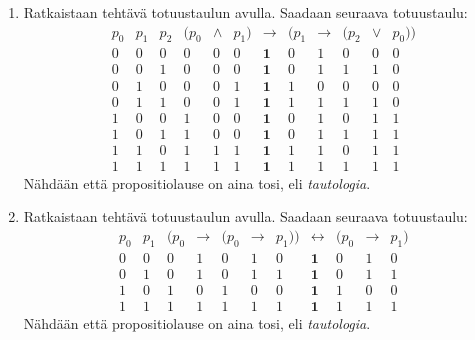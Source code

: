 \documentclass[11pt,a4paper]{amsart}
\begin{document}
\begin{solution}
\leavevmode\par
\begin{enumerate}[label=\alph*), nosep]
\item Ratkaistaan tehtävä totuustaulun avulla. Saadaan seuraava totuustaulu:
\[
\begin{array}{ccc|ccccccccc}
p_0 & p_1 & p_2
& (p_0 & \land & p_1)
& \boldsymbol{\to}
& (p_1 & \to & (p_2 & \lor & p_0)) \\
\hline
0 & 0 & 0
& 0 & 0 & 0
& \mathbf{1}
& 0 & 1 & 0 & 0 & 0 \\

0 & 0 & 1
& 0 & 0 & 0
& \mathbf{1}
& 0 & 1 & 1 & 1 & 0 \\

0 & 1 & 0
& 0 & 0 & 1
& \mathbf{1}
& 1 & 0 & 0 & 0 & 0 \\

0 & 1 & 1
& 0 & 0 & 1
& \mathbf{1}
& 1 & 1 & 1 & 1 & 0 \\

1 & 0 & 0
& 1 & 0 & 0
& \mathbf{1}
& 0 & 1 & 0 & 1 & 1 \\

1 & 0 & 1
& 1 & 0 & 0
& \mathbf{1}
& 0 & 1 & 1 & 1 & 1 \\

1 & 1 & 0
& 1 & 1 & 1
& \mathbf{1}
& 1 & 1 & 0 & 1 & 1 \\

1 & 1 & 1
& 1 & 1 & 1
& \mathbf{1}
& 1 & 1 & 1 & 1 & 1
\end{array}
\]
Nähdään että propositiolause on aina tosi, eli \emph{tautologia}.

\item Ratkaistaan tehtävä totuustaulun avulla. Saadaan seuraava totuustaulu:
\[
\begin{array}{cc|ccccccccc}
p_0 & p_1
& (p_0 & \to & (p_0 & \to & p_1))
& \boldsymbol{\leftrightarrow}
& (p_0 & \to & p_1) \\
\hline
0 & 0
& 0 & 1 & 0 & 1 & 0
& \mathbf{1}
& 0 & 1 & 0 \\

0 & 1
& 0 & 1 & 0 & 1 & 1
& \mathbf{1}
& 0 & 1 & 1 \\

1 & 0
& 1 & 0 & 1 & 0 & 0
& \mathbf{1}
& 1 & 0 & 0 \\

1 & 1
& 1 & 1 & 1 & 1 & 1
& \mathbf{1}
& 1 & 1 & 1
\end{array}
\]
Nähdään että propositiolause on aina tosi, eli \emph{tautologia}.
\end{enumerate}
\end{solution}
\end{document}
